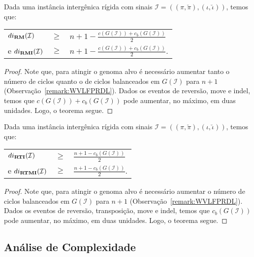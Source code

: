 \begin{theorem}\label{theorem:OCNPWYNL}
Dada uma instância intergênica rígida com sinais $\mathcal{I} = ((\pi,\breve\pi),(\iota,\breve\iota))$, temos que:

\begin{tabular}{lll}
  $di_{\textbf{RM}}(\mathcal{I})$     & $ \ge $ & ${n + 1} - \frac{c(G(\mathcal{I})) + c_b(G(\mathcal{I}))}{2}$ \\
  e $di_{\textbf{RMI}}(\mathcal{I})$    & $ \ge $ & ${n + 1} - \frac{c(G(\mathcal{I})) + c_b(G(\mathcal{I}))}{2}$. \\
\end{tabular}
\end{theorem}
\begin{proof}
Note que, para atingir o genoma alvo é necessário aumentar tanto o número de ciclos quanto o de ciclos balanceados em $G(\mathcal{I})$ para $n+1$ (Observação~\ref{remark:WVLFPRDL}). Dados os eventos de reversão, move e indel, temos que $c(G(\mathcal{I})) + c_b(G(\mathcal{I}))$ pode aumentar, no máximo, em duas unidades. Logo, o teorema segue.
\end{proof}

\begin{theorem}\label{theorem:ZZBNVROM}
Dada uma instância intergênica rígida com sinais $\mathcal{I} = ((\pi,\breve\pi),(\iota,\breve\iota))$, temos que:

\begin{tabular}{lll}
  $di_{\textbf{RTI}}(\mathcal{I})$       & $ \ge $ & $\frac{{n + 1} - c_b(G(\mathcal{I}))}{2}$ \\
  e $di_{\textbf{RTMI}}(\mathcal{I})$    & $ \ge $ & $\frac{{n + 1} - c_b(G(\mathcal{I}))}{2}$. \\
\end{tabular}
\end{theorem}
\begin{proof}
Note que, para atingir o genoma alvo é necessário aumentar o número de ciclos balanceados em $G(\mathcal{I})$ para $n+1$ (Observação~\ref{remark:WVLFPRDL}). Dados os eventos de reversão, transposição, move e indel, temos que $c_b(G(\mathcal{I}))$ pode aumentar, no máximo, em duas unidades. Logo, o teorema segue.
\end{proof}

\subsection{Análise de Complexidade}

